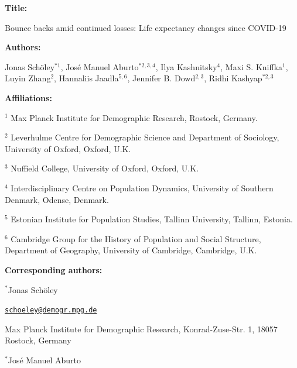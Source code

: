 \documentclass[12pt]{article}
\begin{document}
\begin{titlepage}


{\textbf{Title:}\par
Bounce backs amid continued losses: Life expectancy changes since COVID-19
\par\medskip}

{\textbf{Authors:}\par
Jonas Schöley$^{*1}$,
José Manuel Aburto$^{*2,3,4}$,
Ilya Kashnitsky$^{4}$,
Maxi S. Kniffka$^1$,
Luyin Zhang$^2$,
Hannaliis Jaadla$^{5,6}$,
Jennifer B. Dowd$^{2,3}$,
Ridhi Kashyap$^{*2,3}$
\par\medskip}

{\textbf{Affiliations:}\par
$^1$ Max Planck Institute for Demographic Research, Rostock, Germany.\par
$^2$ Leverhulme Centre for Demographic Science and Department of Sociology, University of Oxford, Oxford, U.K.\par
$^3$ Nuffield College, University of Oxford, Oxford, U.K.\par
$^4$ Interdisciplinary Centre on Population Dynamics, University of Southern Denmark, Odense, Denmark.\par
$^5$ Estonian Institute for Population Studies, Tallinn University, Tallinn, Estonia.\par
$^6$ Cambridge Group for the History of Population and Social Structure, Department of Geography, University of Cambridge, Cambridge, U.K.\par
\par\medskip}

{\textbf{Corresponding authors:}\par

$^{*}$Jonas Schöley

\href{mailto:schoeley@demogr.mpg.de}{\texttt{schoeley@demogr.mpg.de}}

Max Planck Institute for Demographic Research,
Konrad-Zuse-Str. 1,
18057 Rostock, Germany


\vspace{1em}

$^{*}$José Manuel Aburto

}
\end{titlepage}
\end{document}
